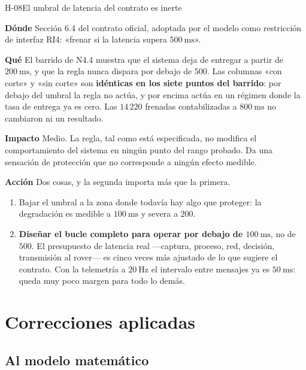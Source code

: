 \documentclass[11pt,a4paper]{article}
\newcommand{\campo}[1]{\par\smallskip\noindent\textbf{#1}\quad\ignorespaces}
\begin{document}
\begin{hallazgo}{H-08}{El umbral de latencia del contrato es inerte}
\campo{Dónde} Sección 6.4 del contrato oficial, adoptada por el modelo como restricción
de interfaz RI4: «frenar si la latencia supera $500\ \mathrm{ms}$».
\campo{Qué} El barrido de N4.4 muestra que el sistema deja de entregar a partir de
$200\ \mathrm{ms}$, y que la regla nunca dispara por debajo de $500$. Las columnas «con
corte» y «sin corte» son \textbf{idénticas en los siete puntos del barrido}: por debajo
del umbral la regla no actúa, y por encima actúa en un régimen donde la tasa de entrega
ya es cero. Las $14\,220$ frenadas contabilizadas a $800\ \mathrm{ms}$ no cambiaron ni
un resultado.
\campo{Impacto} Medio. La regla, tal como está especificada, no modifica el
comportamiento del sistema en ningún punto del rango probado. Da una sensación de
protección que no corresponde a ningún efecto medible.
\campo{Acción} Dos cosas, y la segunda importa más que la primera.
\begin{enumerate}[label=(\alph*),leftmargin=2em,itemsep=1pt,topsep=2pt]
\item Bajar el umbral a la zona donde todavía hay algo que proteger: la degradación es
      medible a $100\ \mathrm{ms}$ y severa a $200$.
\item \textbf{Diseñar el bucle completo para operar por debajo de $100\ \mathrm{ms}$},
      no de $500$. El presupuesto de latencia real ---captura, proceso, red, decisión,
      transmisión al rover--- es cinco veces más ajustado de lo que sugiere el contrato.
      Con la telemetría a $20\ \mathrm{Hz}$ el intervalo entre mensajes ya es
      $50\ \mathrm{ms}$: queda muy poco margen para todo lo demás.
\end{enumerate}
\end{hallazgo}

\section{Correcciones aplicadas}

\subsection{Al modelo matemático}
\end{document}
